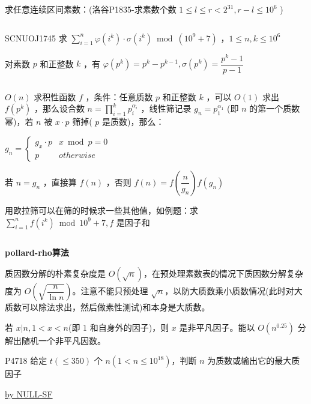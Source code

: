 \documentclass[twocolumn,10pt]{ctexart}
\makeatletter
\newcommand{\hfive}[1]{\par\addvspace{6pt}\@afterindentfalse
  {\noindent\bfseries\normalsize #1}\par\nobreak\vspace{2pt}}
\makeatother
\begin{document}
求任意连续区间素数：(洛谷P1835-求素数个数 $1\le l\le r < 2^{31},\allowbreak{}r-l\le10^6$ )

\inputminted{cpp}{code/p1835_euler.cpp}

\begin{notebox}
SCNUOJ1745 求 $\sum_{i=1}^n\varphi(i^k)\cdot\sigma(i^k)\bmod(10^9+7)$ ，$1\le n,k\le10^6$
\end{notebox}

对素数 $p$ 和正整数 $k$ ，有 $\varphi(p^k)=p^k-p^{k-1},\allowbreak{}\sigma(p^k)=\dfrac{p^k-1}{p-1}$

\inputminted{cpp}{code/ext_004.cpp}

$O(n)$ 求积性函数 $f$ ，条件：任意质数 $p$ 和正整数 $k$ ，可以 $O(1)$ 求出 $f(p^k)$ ，那么设合数 $n=\prod_{i=1}^kp_i^{\alpha_i}$ ，线性筛记录 $g_n=p_1^{\alpha_1}$ (即 $n$ 的第一个质数幂)，若 $n$ 被 $x\cdot p$ 筛掉( $p$ 是质数)，那么：

\begin{adjustbox}{max width=\linewidth,center}
$g_n=\begin{cases}g_x\cdot p&x\bmod p=0\\p&otherwise\end{cases}$
\end{adjustbox}

若 $n=g_n$ ，直接算 $f(n)$ ，否则 $f(n)=f(\dfrac n{g_n})f(g_n)$

\begin{notebox}
用欧拉筛可以在筛的时候求一些其他值，如例题：求 $\sum_{i=1}^nf(i^k)\bmod10^9+7,\allowbreak{}f$ 是因子和
\end{notebox}

\inputminted{cpp}{code/eg_euler.cpp}

\hfive{pollard-rho算法}

质因数分解的朴素复杂度是 $O(\sqrt n)$，在预处理素数表的情况下质因数分解复杂度为 $O(\sqrt{\dfrac n{\ln n}})$。注意不能只预处理 $\sqrt n$，以防大质数乘小质数情况(此时对大质数可以除法求出，然后做素性测试)和本身是大质数。

若 $x|n,1 < x < n$(即 $1$ 和自身外的因子)，则 $x$ 是非平凡因子。能以 $O(n^{0.25})$ 分解出随机一个非平凡因数。

\begin{notebox}
P4718 给定 $t(\le 350)$ 个 $n(1 < n\le10^{18})$，判断 $n$ 为质数或输出它的最大质因子
\end{notebox}

\href{https://github.com/NULL-SF}{by NULL-SF}

\inputminted{cpp}{code/p4718_pollard_rho.cpp}
\end{document}
